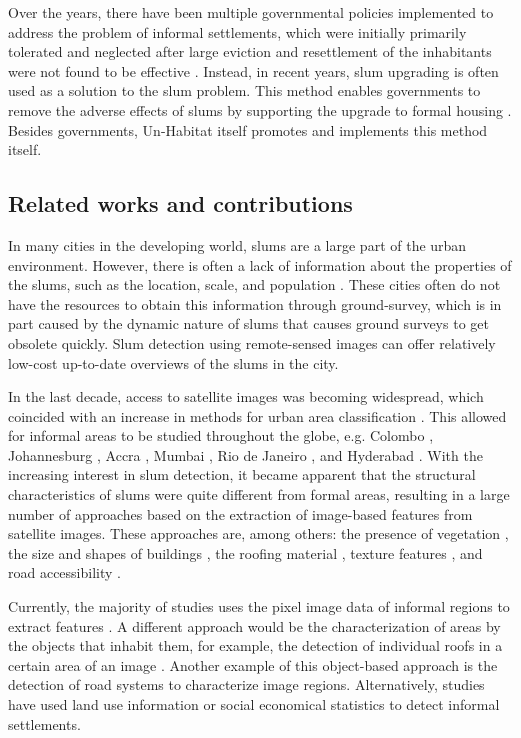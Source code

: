 Over the years, there have been multiple governmental policies implemented to address the problem of informal settlements, which were initially primarily tolerated and neglected after large eviction and resettlement of the inhabitants were not found to be effective \cite{kuffer2016slums}. Instead, in recent years, slum upgrading is often used as a solution to the slum problem. This method enables governments to remove the adverse effects of slums by supporting the upgrade to formal housing \cite{cobbett2013cities}. Besides governments, Un-Habitat itself promotes and implements this method itself\cite{2015globact}.

\subsection{Related works and contributions}
In many cities in the developing world, slums are a large part of the urban environment. However, there is often a lack of information about the properties of the slums, such as the location, scale, and population \cite{kuffer2016slums}. These cities often do not have the resources to obtain this information through ground-survey, which is in part caused by the dynamic nature of slums that causes ground surveys to get obsolete quickly. Slum detection using remote-sensed images can offer relatively low-cost up-to-date overviews of the slums in the city.

In the last decade, access to satellite images was becoming widespread, which coincided with an increase in methods for urban area classification \cite{kuffer2016slums}. This allowed for informal areas to be studied throughout the globe, e.g. Colombo \cite{colombo}, Johannesburg \cite{williams2016automatic}, Accra \cite{accra}, Mumbai \cite{mumbai}, Rio de Janeiro \cite{hofmann2008detecting}, and Hyderabad \cite{hyderabad}. With the increasing interest in slum detection, it became apparent that the structural characteristics of slums were quite different from formal areas, resulting in a large number of approaches based on the extraction of image-based features from satellite images. These approaches are, among others: the presence of vegetation \cite{niebergall2007object}, the size and shapes of buildings \cite{hofmann2008detecting}, the roofing material \cite{williams2016automatic}, texture features \cite{mattia2007exploiting}, and road accessibility \cite{owen2013approach}.

Currently, the majority of studies uses the pixel image data of informal regions to extract features \cite{kuffer2016slums}. A different approach would be the characterization of areas by the objects that inhabit them, for example, the detection of individual roofs in a certain area of an image \cite{williams2016automatic}. Another example of this object-based approach is the detection of road systems to characterize image regions. Alternatively, studies have used land use information \cite{novack2010urban} or social economical statistics \cite{engstrom2011using} to detect informal settlements.




